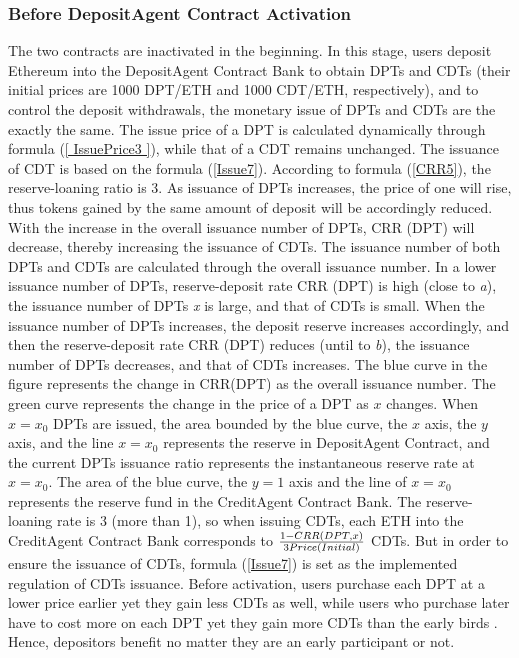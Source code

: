 \documentclass[a4paper, 10pt, conference]{ieeeconf} %
\begin{document}
\subsubsection{Before DepositAgent Contract Activation}
The two contracts are inactivated in the beginning. In this stage, users deposit Ethereum into the DepositAgent Contract Bank to obtain DPTs and CDTs (their initial prices are 1000 DPT/ETH and 1000 CDT/ETH, respectively), and to control the deposit withdrawals, the monetary issue of DPTs and CDTs are the exactly the same. The issue price of a DPT is calculated dynamically through formula (\ref{ IssuePrice3 }), while that of a CDT remains unchanged. The issuance of CDT is based on the formula (\ref{Issue7}). According to formula (\ref{CRR5}), the reserve-loaning ratio is 3. As issuance of DPTs increases, the price of one will rise, thus tokens gained by the same amount of deposit will be accordingly reduced. With the increase in the overall issuance number of DPTs, CRR (DPT) will decrease, thereby increasing the issuance of CDTs. The issuance number of both DPTs and CDTs are calculated through the overall issuance number. In a lower issuance number of DPTs, reserve-deposit rate CRR (DPT) is high (close to \emph{a}), the issuance number of DPTs \emph{x} is large, and that of CDTs is small. When the issuance number of DPTs increases, the deposit reserve increases accordingly, and then the reserve-deposit rate CRR (DPT) reduces (until to \emph{b}), the issuance number of DPTs decreases, and that of CDTs increases. The blue curve in the figure represents the change in CRR(DPT) as the overall issuance number. 
The green curve represents the change in the price of a DPT as $x$ changes. When ${x = x_0}$ DPTs are issued, the area bounded by the blue curve, the  $x$ axis, the  $y$ axis, and the line ${x = x_0}$ represents the reserve in DepositAgent Contract, and the current DPTs issuance ratio represents the instantaneous reserve rate at ${x = x_0}$. The area of the blue curve, the ${y = 1}$ axis and the line of ${x = x_0}$ represents the reserve fund in the CreditAgent Contract Bank. The reserve-loaning rate is 3 (more than 1), so when issuing CDTs, each ETH into the CreditAgent Contract Bank corresponds to ${\frac{1 - CRR(DPT, x)}{3\*Price(Initial)}}$ CDTs. But in order to ensure the issuance of CDTs, formula (\ref{Issue7}) is set as the implemented regulation of CDTs issuance. Before activation, users purchase each DPT at a lower price earlier yet they gain less CDTs as well, while users who purchase later have to cost more on each DPT yet they gain more CDTs than the early birds . Hence, depositors benefit no matter they are an early participant or not.
\end{document}
